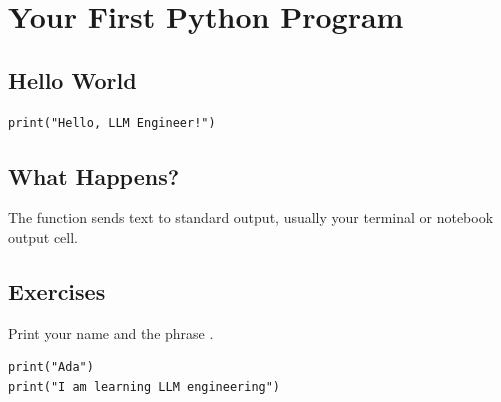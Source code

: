 \chapter{Your First Python Program}
\label{chap:first-python-program}
\section{Hello World}\begin{lstlisting}
print("Hello, LLM Engineer!")
\end{lstlisting}
\section{What Happens?}The  function sends text to standard output, usually your terminal or notebook output cell.
\section{Exercises}\begin{exercise}Print your name and the phrase .\end{exercise}\begin{solution}\begin{lstlisting}
print("Ada")
print("I am learning LLM engineering")
\end{lstlisting}\end{solution}
